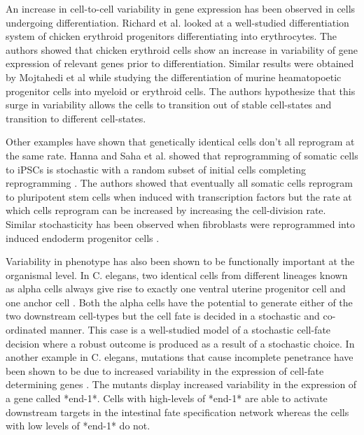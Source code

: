 An increase in cell-to-cell variability in gene expression has been observed in cells undergoing differentiation. Richard et al.  \cite{richard_single-cell-based_2016} looked at a well-studied differentiation system of chicken erythroid progenitors differentiating into erythrocytes. The authors showed that chicken erythroid cells show an increase in variability of gene expression of relevant genes prior to differentiation. Similar results were obtained by Mojtahedi et al  \cite{mojtahedi_cell_2016} while studying the differentiation of murine heamatopoetic progenitor cells into myeloid or erythroid cells. The authors hypothesize that this surge in variability allows the cells to transition out of stable cell-states and transition to different cell-states. 

Other examples have shown that genetically identical cells don't all reprogram at the same rate. Hanna and Saha et al. showed that reprogramming of somatic cells to iPSCs is stochastic with a random subset of initial cells completing reprogramming  \cite{hanna_direct_2009}. The authors showed that eventually all somatic cells reprogram to pluripotent stem cells when induced with transcription factors but the rate at which cells reprogram can be increased by increasing the cell-division rate. Similar stochasticity has been observed when fibroblasts were reprogrammed into induced endoderm progenitor cells \cite{biddy_single-cell_2018}.

Variability in phenotype has also been shown to be functionally important at the organismal level. In C. elegans, two identical cells from different lineages known as alpha cells always give rise to exactly one ventral uterine progenitor cell and one anchor cell \cite{seydoux_cell_1989}. Both the alpha cells have the potential to generate either of the two downstream cell-types but the cell fate is decided in a stochastic and co-ordinated manner. This case is a well-studied model of a stochastic cell-fate decision where a robust outcome is produced as a result of a stochastic choice. In another example in C. elegans, mutations that cause incomplete penetrance have been shown to be due to increased variability in the expression of cell-fate determining genes  \cite{raj_variability_2010}.  The mutants display increased variability in the expression of a gene called *end-1*. Cells with high-levels of *end-1* are able to activate downstream targets in the intestinal fate specification network whereas the cells with low levels of *end-1* do not. 

